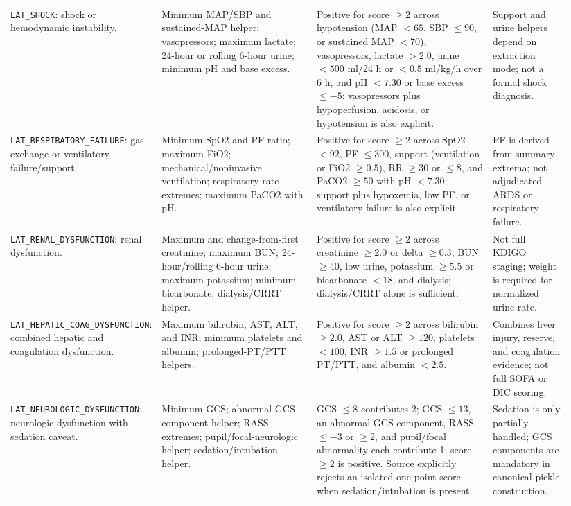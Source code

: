 \begin{landscape}
\begin{longtable}{@{}L{0.19\linewidth}L{0.29\linewidth}L{0.32\linewidth}L{0.14\linewidth}@{}}
\nolinkurl{LAT_SHOCK}: shock or hemodynamic instability. & Minimum MAP/SBP and sustained-MAP helper; vasopressors; maximum lactate; 24-hour or rolling 6-hour urine; minimum pH and base excess. & Positive for score $\ge 2$ across hypotension (MAP $<65$, SBP $\le 90$, or sustained MAP $<70$), vasopressors, lactate $>2.0$, urine $<500$ ml/24 h or $<0.5$ ml/kg/h over 6 h, and pH $<7.30$ or base excess $\le -5$; vasopressors plus hypoperfusion, acidosis, or hypotension is also explicit. & Support and urine helpers depend on extraction mode; not a formal shock diagnosis. \\
\nolinkurl{LAT_RESPIRATORY_FAILURE}: gas-exchange or ventilatory failure/support. & Minimum SpO2 and PF ratio; maximum FiO2; mechanical/noninvasive ventilation; respiratory-rate extremes; maximum PaCO2 with pH. & Positive for score $\ge 2$ across SpO2 $<92$, PF $\le 300$, support (ventilation or FiO2 $\ge 0.5$), RR $\ge 30$ or $\le 8$, and PaCO2 $\ge 50$ with pH $<7.30$; support plus hypoxemia, low PF, or ventilatory failure is also explicit. & PF is derived from summary extrema; not adjudicated ARDS or respiratory failure. \\
\nolinkurl{LAT_RENAL_DYSFUNCTION}: renal dysfunction. & Maximum and change-from-first creatinine; maximum BUN; 24-hour/rolling 6-hour urine; maximum potassium; minimum bicarbonate; dialysis/CRRT helper. & Positive for score $\ge 2$ across creatinine $\ge 2.0$ or delta $\ge 0.3$, BUN $\ge 40$, low urine, potassium $\ge 5.5$ or bicarbonate $<18$, and dialysis; dialysis/CRRT alone is sufficient. & Not full KDIGO staging; weight is required for normalized urine rate. \\
\nolinkurl{LAT_HEPATIC_COAG_DYSFUNCTION}: combined hepatic and coagulation dysfunction. & Maximum bilirubin, AST, ALT, and INR; minimum platelets and albumin; prolonged-PT/PTT helpers. & Positive for score $\ge 2$ across bilirubin $\ge 2.0$, AST or ALT $\ge 120$, platelets $<100$, INR $\ge 1.5$ or prolonged PT/PTT, and albumin $<2.5$. & Combines liver injury, reserve, and coagulation evidence; not full SOFA or DIC scoring. \\
\nolinkurl{LAT_NEUROLOGIC_DYSFUNCTION}: neurologic dysfunction with sedation caveat. & Minimum GCS; abnormal GCS-component helper; RASS extremes; pupil/focal-neurologic helper; sedation/intubation helper. & GCS $\le 8$ contributes 2; GCS $\le 13$, an abnormal GCS component, RASS $\le -3$ or $\ge 2$, and pupil/focal abnormality each contribute 1; score $\ge 2$ is positive.  Source explicitly rejects an isolated one-point score when sedation/intubation is present. & Sedation is only partially handled; GCS components are mandatory in canonical-pickle construction. \\

\end{longtable}
\end{landscape}
